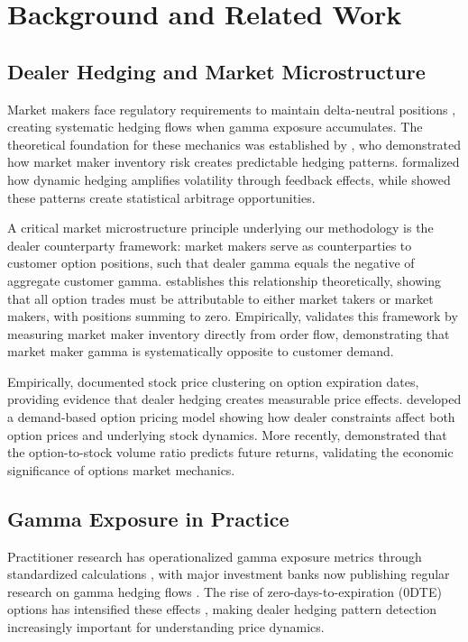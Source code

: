 \section{Background and Related Work}

\subsection{Dealer Hedging and Market Microstructure}

Market makers face regulatory requirements to maintain delta-neutral positions \cite{sec15c31,finra4210}, creating systematic hedging flows when gamma exposure accumulates. The theoretical foundation for these mechanics was established by \cite{grossman1988liquidity}, who demonstrated how market maker inventory risk creates predictable hedging patterns. \cite{frey1997market} formalized how dynamic hedging amplifies volatility through feedback effects, while \cite{avellaneda2010statistical} showed these patterns create statistical arbitrage opportunities.

A critical market microstructure principle underlying our methodology is the dealer counterparty framework: market makers serve as counterparties to customer option positions, such that dealer gamma equals the negative of aggregate customer gamma. \cite{anderegg2022impact} establishes this relationship theoretically, showing that all option trades must be attributable to either market takers or market makers, with positions summing to zero. Empirically, \cite{dim2025zero} validates this framework by measuring market maker inventory directly from order flow, demonstrating that market maker gamma is systematically opposite to customer demand.

Empirically, \cite{ni2005stock} documented stock price clustering on option expiration dates, providing evidence that dealer hedging creates measurable price effects. \cite{garleanu2009demand} developed a demand-based option pricing model showing how dealer constraints affect both option prices and underlying stock dynamics. More recently, \cite{ge2016why} demonstrated that the option-to-stock volume ratio predicts future returns, validating the economic significance of options market mechanics.

\subsection{Gamma Exposure in Practice}
Practitioner research has operationalized gamma exposure metrics through standardized calculations \cite{spotgamma2019,spotgamma2021, squeezemetrics2017,squeezemetrics2020}, with major investment banks now publishing regular research on gamma hedging flows \cite{nomura2017}. The rise of zero-days-to-expiration (0DTE) options has intensified these effects \cite{cboe2023,jpmorgan2023}, making dealer hedging pattern detection increasingly important for understanding price dynamics.

